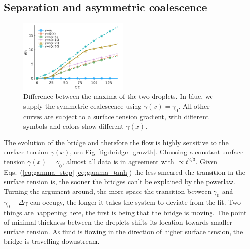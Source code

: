 \documentclass[twocolumn,amsmath,amssymb,showpacs,pre,nofootinbib,superscriptaddress]{revtex4-1} %
\begin{document}
\subsection{Separation and asymmetric coalescence}\label{subsec:separation}
\begin{figure}
    \centering
    \includegraphics[width=0.48\textwidth]{Figures/hdiff.pdf}
    \caption{Difference between the maxima of the two droplets.
    In blue, we supply the symmetric coalescence using $\gamma(x) = \gamma_0$.
    All other curves are subject to a surface tension gradient, with different symbols and colors show different $\gamma(x)$.
    }
    \label{fig:drop_diff}
\end{figure}
The evolution of the bridge and therefore the flow is highly sensitive to the surface tension $\gamma(x)$, see Fig~\ref{fig:bridge_growth}.
Choosing a constant surface tension $\gamma(x) = \gamma_0$, almost all data is in agreement with $\propto t^{2/3}$.
Given Eqs.~(\ref{eq:gamma_step}-\ref{eq:gamma_tanh}) the less smeared the transition in the surface tension is, the sooner the bridges can't be explained by the powerlaw.
Turning the argument around, the more space the transition between $\gamma_0$ and $\gamma_0-\Delta\gamma$ can occupy, the longer it takes the system to deviate from the fit.
Two things are happening here, the first is being that the bridge is moving.
The point of minimal thickness between the droplets shifts its location towards smaller surface tension.
As fluid is flowing in the direction of higher surface tension, the bridge is travelling downstream.
\end{document}
